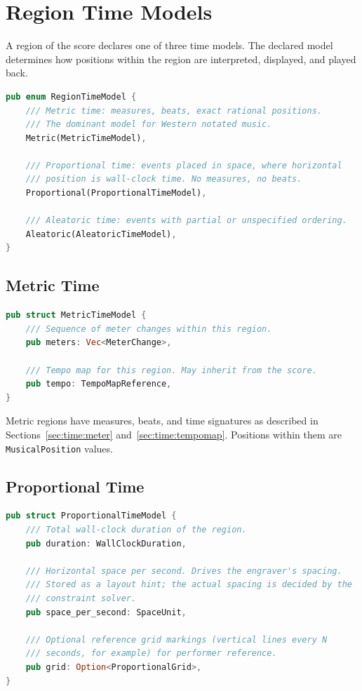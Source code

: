 \documentclass[11pt,letterpaper]{report}
\begin{document}
\section{Region Time Models}
\label{sec:time:regions}

A region of the score declares one of three time models. The declared
model determines how positions within the region are interpreted,
displayed, and played back.

\begin{lstlisting}[language=Rust]
pub enum RegionTimeModel {
    /// Metric time: measures, beats, exact rational positions.
    /// The dominant model for Western notated music.
    Metric(MetricTimeModel),

    /// Proportional time: events placed in space, where horizontal
    /// position is wall-clock time. No measures, no beats.
    Proportional(ProportionalTimeModel),

    /// Aleatoric time: events with partial or unspecified ordering.
    Aleatoric(AleatoricTimeModel),
}
\end{lstlisting}

\subsection{Metric Time}

\begin{lstlisting}[language=Rust]
pub struct MetricTimeModel {
    /// Sequence of meter changes within this region.
    pub meters: Vec<MeterChange>,

    /// Tempo map for this region. May inherit from the score.
    pub tempo: TempoMapReference,
}
\end{lstlisting}

Metric regions have measures, beats, and time signatures as described
in Sections~\ref{sec:time:meter} and~\ref{sec:time:tempomap}. Positions
within them are \texttt{MusicalPosition} values.

\subsection{Proportional Time}

\begin{lstlisting}[language=Rust]
pub struct ProportionalTimeModel {
    /// Total wall-clock duration of the region.
    pub duration: WallClockDuration,

    /// Horizontal space per second. Drives the engraver's spacing.
    /// Stored as a layout hint; the actual spacing is decided by the
    /// constraint solver.
    pub space_per_second: SpaceUnit,

    /// Optional reference grid markings (vertical lines every N
    /// seconds, for example) for performer reference.
    pub grid: Option<ProportionalGrid>,
}
\end{lstlisting}
\end{document}
